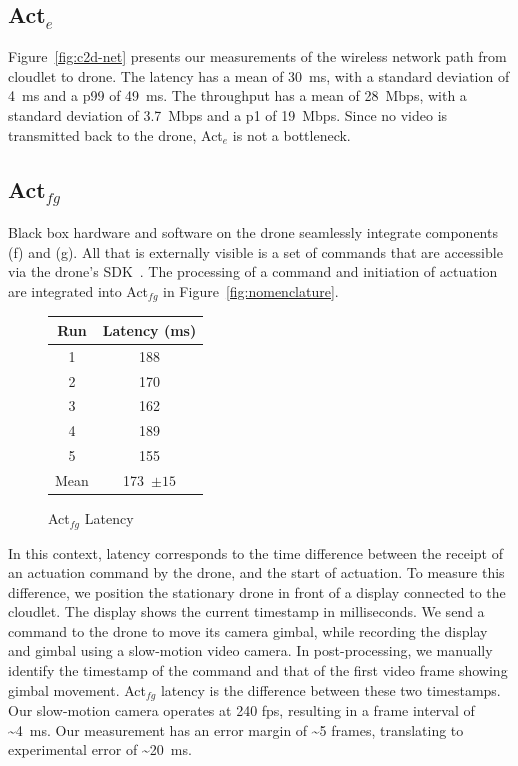 \subsection{Act$_e$}
\label{sec:netuplink}

Figure~\ref{fig:c2d-net} presents our measurements of the wireless
network path from cloudlet to drone.  The latency has a mean of 30~ms,
with a standard deviation of 4~ms and a p99 of 49~ms.  The throughput
has a mean of 28~Mbps, with a standard deviation of 3.7~Mbps and a p1
of 19~Mbps.  Since no video is transmitted back to the drone, Act$_e$
is not a bottleneck.


\subsection{Act$_{fg}$}
\label{sec:c2d-drone}

\begingroup
\setlength{\columnsep}{4pt}

Black box hardware and software on the drone seamlessly integrate
components (f) and (g).  All that is externally visible is a set of
commands that are accessible via the drone's SDK~\cite{Olympe2024}.
The processing of a command and initiation of actuation are integrated
into Act$_{fg}$ in Figure~\ref{fig:nomenclature}.
\begin{figure}
\vspace{-0.07in}
\centering
    \begin{tabular}{@{}cc@{}}
\toprule
Run & Latency (ms)\\
\midrule
 1&188\\
 2&170\\
 3&162\\
 4&189\\
 5&155\\
\midrule
Mean& 173~{\small$\pm15$}\\
\bottomrule
\end{tabular}
\caption{\small Act$_{fg}$  Latency}
\label{fig:c2d-drone-histo}
\vspace{-0.1in}
\end{figure}
In this context, latency corresponds to the time difference between
the receipt of an actuation command by the drone, and the start of
actuation.  To measure this difference, we position the stationary
drone in front of a display connected to the cloudlet.  The display
shows the current timestamp in milliseconds. We send a command to the
drone to move its camera gimbal, while recording the display and
gimbal using a slow-motion video camera. In post-processing, we
manually identify the timestamp of the command and that of the first
video frame showing gimbal movement.  Act$_{fg}$ latency is the
difference between these two timestamps.  Our slow-motion camera
operates at 240 fps, resulting in a frame interval of
\textasciitilde4~ms.  Our measurement has an error margin of
\textasciitilde5 frames, translating to experimental error of
\textasciitilde20~ms.

